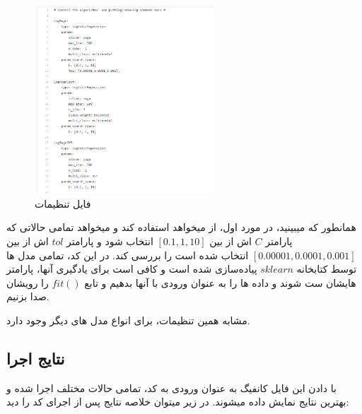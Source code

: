 \begin{figure}[h]
	\centering
	\includegraphics[width=0.6\textwidth]{training/8}
	\caption{فایل تنظیمات}
	\label{fig:training:config-file}
\end{figure} 

همانطور که میبینید، در مورد اول، از 
میخواهد استفاده کند و میخواهد تمامی حالاتی که پارامتر $C$ اش از بین 
$[0.1, 1, 10]$
انتخاب شود و پارامتر  $tol$ اش از بین 
$[0.00001,0.0001,0.001]$
انتخاب شده است را بررسی کند. در این کد، تمامی مدل ها توسط کتابخانه $sklearn$ پیاده‌سازی شده است و کافی است برای یادگیری آنها، پارامتر هایشان ست شوند و داده ها را به عنوان ورودی با آنها بدهیم و تابع $fit()$ را رویشان صدا بزنیم. 

مشابه همین تنظیمات، برای انواع مدل های دیگر وجود دارد. 

\subsection{نتایج اجرا}

با دادن این فایل کانفیگ به عنوان ورودی به کد، تمامی حالات مختلف اجرا شده و بهترین نتایج نمایش داده میشوند. در زیر میتوان خلاصه نتایج پس از اجرای کد را دید:

